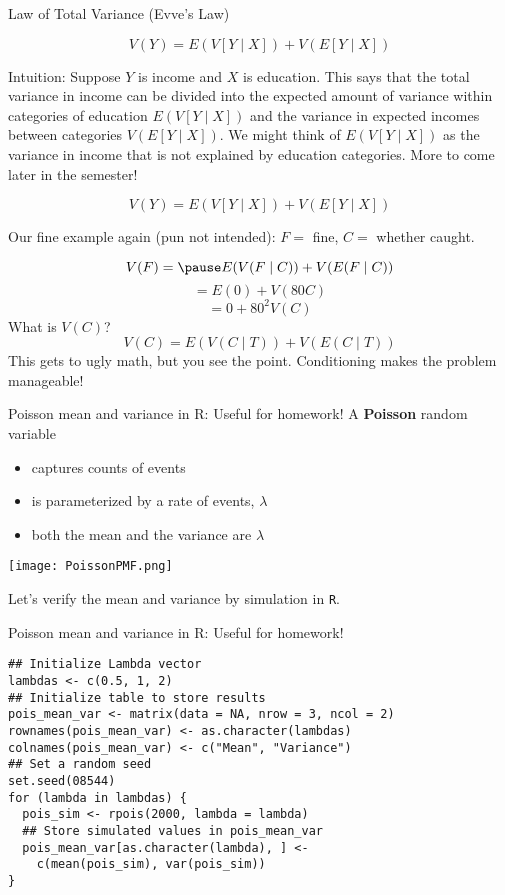 \documentclass{beamer}
\begin{document}
\begin{frame}{Law of Total Variance (Evve's Law)}
\begin{theorem}
$$V(Y)=E(V[Y\mid X])+V(E[Y\mid X])$$
\end{theorem}
\alert{Intuition:} Suppose $Y$ is income and $X$ is education. This says that the total variance in income can be divided into the expected amount of \alert{variance within categories} of education $E(V[Y\mid X])$ and the variance in expected incomes \alert{between categories} $V(E[Y\mid X])$.
\newline
\newline
We might think of $E(V[Y\mid X])$ as the variance in income that is not explained by education categories. More to come later in the semester!
\end{frame}

\begin{frame}
\begin{theorem}
$$V(Y)=E(V[Y\mid X])+V(E[Y\mid X])$$
\end{theorem}
Our fine example again (pun not intended): $F=$ fine, $C=$ whether caught.

$$V(F)=\pause E(V(F\mid C))+V(E(F\mid C))$$
\pause $$=E(0)+V(80C)$$
\pause $$=0+80^2V(C)$$
\pause
What is $V(C)$?
\pause
$$V(C)=E(V(C\mid T))+V(E(C\mid T))$$
This gets to ugly math, but you see the point. Conditioning makes the problem manageable!
\end{frame}

\begin{frame}{Poisson mean and variance in R: Useful for homework!}
A \textbf{Poisson} random variable
\begin{itemize}
\item captures counts of events
\item is parameterized by a rate of events, $\lambda$
\item both the mean and the variance are $\lambda$
\end{itemize}
\begin{center}\texttt{[image: PoissonPMF.png]}\end{center}

Let's verify the mean and variance by simulation in \texttt{R}.
\end{frame}

\begin{frame}[fragile]{Poisson mean and variance in R: Useful for homework!}
\begin{footnotesize}
\begin{verbatim}
## Initialize Lambda vector
lambdas <- c(0.5, 1, 2)
## Initialize table to store results
pois_mean_var <- matrix(data = NA, nrow = 3, ncol = 2)
rownames(pois_mean_var) <- as.character(lambdas)
colnames(pois_mean_var) <- c("Mean", "Variance")
## Set a random seed
set.seed(08544)
for (lambda in lambdas) {
  pois_sim <- rpois(2000, lambda = lambda)
  ## Store simulated values in pois_mean_var
  pois_mean_var[as.character(lambda), ] <- 
    c(mean(pois_sim), var(pois_sim))
}
\end{verbatim}
\end{footnotesize}
\end{frame}
\end{document}

